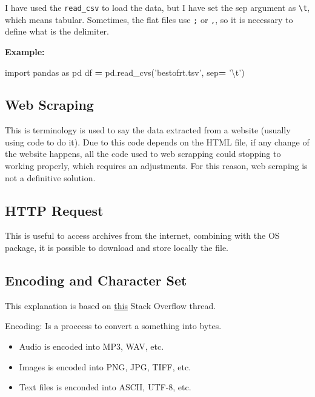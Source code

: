\documentclass[]{book}
\newenvironment{Shaded}{\begin{snugshade}}{\end{snugshade}}
\newcommand{\CharTok}[1]{\textcolor[rgb]{0.31,0.60,0.02}{#1}}
\newcommand{\StringTok}[1]{\textcolor[rgb]{0.31,0.60,0.02}{#1}}
\newcommand{\ImportTok}[1]{#1}
\newcommand{\OperatorTok}[1]{\textcolor[rgb]{0.81,0.36,0.00}{\textbf{#1}}}
\newcommand{\NormalTok}[1]{#1}
\providecommand{\tightlist}{%
  \setlength{\itemsep}{0pt}\setlength{\parskip}{0pt}}
\begin{document}
I have used the \texttt{read\_csv} to load the data, but I have set the
sep argument as \texttt{\textbackslash{}t}, which means tabular.
Sometimes, the flat files use \texttt{;} or \texttt{,}, so it is
necessary to define what is the delimiter.

\textbf{Example:}

\begin{Shaded}
\begin{Highlighting}[]
\ImportTok{import}\NormalTok{ pandas }\ImportTok{as}\NormalTok{ pd}
\NormalTok{df }\OperatorTok{=}\NormalTok{ pd.read_cvs(}\StringTok{'bestofrt.tsv'}\NormalTok{, sep}\OperatorTok{=} \StringTok{'}\CharTok{\textbackslash{}t}\StringTok{'}\NormalTok{)}
\end{Highlighting}
\end{Shaded}

\subsection{Web Scraping}\label{web-scraping}

This is terminology is used to say the data extracted from a website
(usually using code to do it). Due to this code depends on the HTML
file, if any change of the website happens, all the code used to web
scrapping could stopping to working properly, which requires an
adjustments. For this reason, web scraping is not a definitive solution.

\subsection{HTTP Request}\label{http-request}

This is useful to access archives from the internet, combining with the
OS package, it is possible to download and store locally the file.

\subsection{Encoding and Character
Set}\label{encoding-and-character-set}

This explanation is based on
\href{https://stackoverflow.com/questions/6224052/what-is-the-difference-between-a-string-and-a-byte-string}{this}
Stack Overflow thread.

Encoding: Is a proccess to convert a something into bytes.

\begin{itemize}
\tightlist
\item
  Audio is encoded into MP3, WAV, etc.
\item
  Images is encoded into PNG, JPG, TIFF, etc.
\item
  Text files is enconded into ASCII, UTF-8, etc.
\end{itemize}
\end{document}
